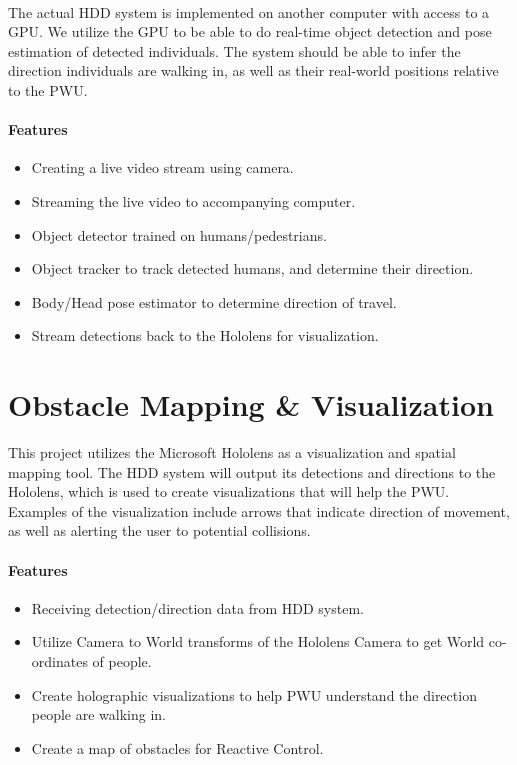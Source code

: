 \paragraph{}The actual HDD system is implemented on another computer with access to a GPU. We utilize the GPU to be able to do real-time object detection and pose estimation of detected individuals. The system should be able to infer the direction individuals are walking in, as well as their real-world positions relative to the PWU.

\paragraph{Features} 
\begin{itemize}
	\item Creating a live video stream using camera.
	\item Streaming the live video to accompanying computer.
	\item Object detector trained on humans/pedestrians.
	\item Object tracker to track detected humans, and determine their direction.
	\item Body/Head pose estimator to determine direction of travel.
	\item Stream detections back to the Hololens for visualization.
\end{itemize}

\section{Obstacle Mapping \& Visualization }
This project utilizes the Microsoft Hololens as a visualization and spatial mapping tool. The HDD system will output its detections and directions to the Hololens, which is used to create visualizations that will help the PWU. Examples of the visualization include arrows that indicate direction of movement, as well as alerting the user to potential collisions.

\paragraph{Features}
\begin{itemize}
	\item Receiving detection/direction data from HDD system.
	\item Utilize Camera to World transforms of the Hololens Camera to get World co-ordinates of people.
	\item Create holographic visualizations to help PWU understand the direction people are walking in.
	\item Create a map of obstacles for Reactive Control.
\end{itemize}
 
